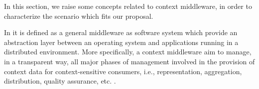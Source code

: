 \documentclass[letterpaper,conference]{IEEEtran}
\begin{document}

 In this section, we raise some concepts related to context middleware, in order to 
 characterize the scenario which fits our proposal. 
 
 In \cite{kjaer2007survey} it is defined as a general middleware as software system which 
 provide an abstraction layer between an operating system and applications running in a 
 distributed environment. More specifically, a context middleware aim to manage, in a 
 transparent way, all major phases of management involved in the provision of context data
 for context-sensitive consumers, i.e., representation, aggregation, distribution, 
 quality assurance, etc.  \cite{baldauf2007survey}.
% 
% 
\end{document}
